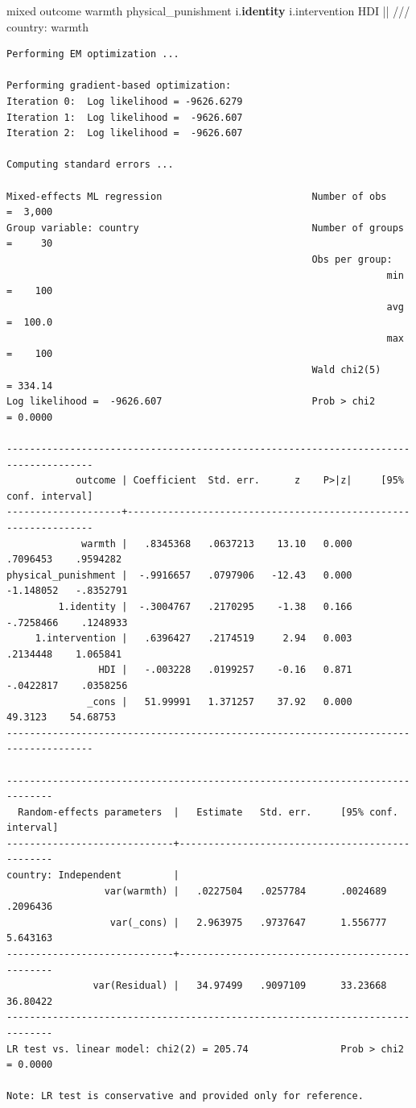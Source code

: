 \documentclass[
  letterpaper,
  DIV=11,
  numbers=noendperiod]{scrreprt}
\newenvironment{Shaded}{\begin{snugshade}}{\end{snugshade}}
\newcommand{\CommentTok}[1]{\textcolor[rgb]{0.37,0.37,0.37}{#1}}
\newcommand{\KeywordTok}[1]{\textcolor[rgb]{0.00,0.23,0.31}{\textbf{#1}}}
\newcommand{\NormalTok}[1]{\textcolor[rgb]{0.00,0.23,0.31}{#1}}
\begin{document}
\begin{Shaded}
\begin{Highlighting}[]
\NormalTok{mixed outcome warmth physical\_punishment i.}\KeywordTok{identity}\NormalTok{ i.intervention HDI || }\CommentTok{/// }
\NormalTok{country: warmth}
\end{Highlighting}
\end{Shaded}

\begin{verbatim}
Performing EM optimization ...

Performing gradient-based optimization: 
Iteration 0:  Log likelihood = -9626.6279  
Iteration 1:  Log likelihood =  -9626.607  
Iteration 2:  Log likelihood =  -9626.607  

Computing standard errors ...

Mixed-effects ML regression                          Number of obs    =  3,000
Group variable: country                              Number of groups =     30
                                                     Obs per group:
                                                                  min =    100
                                                                  avg =  100.0
                                                                  max =    100
                                                     Wald chi2(5)     = 334.14
Log likelihood =  -9626.607                          Prob > chi2      = 0.0000

-------------------------------------------------------------------------------------
            outcome | Coefficient  Std. err.      z    P>|z|     [95% conf. interval]
--------------------+----------------------------------------------------------------
             warmth |   .8345368   .0637213    13.10   0.000     .7096453    .9594282
physical_punishment |  -.9916657   .0797906   -12.43   0.000    -1.148052   -.8352791
         1.identity |  -.3004767   .2170295    -1.38   0.166    -.7258466    .1248933
     1.intervention |   .6396427   .2174519     2.94   0.003     .2134448    1.065841
                HDI |   -.003228   .0199257    -0.16   0.871    -.0422817    .0358256
              _cons |   51.99991   1.371257    37.92   0.000      49.3123    54.68753
-------------------------------------------------------------------------------------

------------------------------------------------------------------------------
  Random-effects parameters  |   Estimate   Std. err.     [95% conf. interval]
-----------------------------+------------------------------------------------
country: Independent         |
                 var(warmth) |   .0227504   .0257784      .0024689    .2096436
                  var(_cons) |   2.963975   .9737647      1.556777    5.643163
-----------------------------+------------------------------------------------
               var(Residual) |   34.97499   .9097109      33.23668    36.80422
------------------------------------------------------------------------------
LR test vs. linear model: chi2(2) = 205.74                Prob > chi2 = 0.0000

Note: LR test is conservative and provided only for reference.
\end{verbatim}
\end{document}
